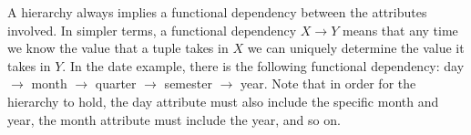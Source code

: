 A hierarchy always implies a functional dependency between the attributes involved.
In simpler terms, a functional dependency $X \rightarrow Y$ means that any time we know the value that a tuple takes in $X$ we can uniquely determine the value it takes in $Y$. In the date example, there is the following functional dependency: day $\rightarrow$ month $\rightarrow$ quarter $\rightarrow$ semester $\rightarrow$ year. Note that in order for the hierarchy to hold, the day attribute must also include the specific month and year, the month attribute must include the year, and so on.
